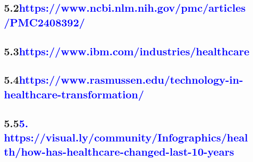 \documentclass[12pt]{article}
\begin{document}
\subsection*{\textbf{5.2\hspace{1cm}\large{\textcolor{blue}{https://www.ncbi.nlm.nih.gov/pmc/articles/PMC2408392/}}}}
\subsection*{\textbf{5.3\hspace{1cm}\large{\textcolor{blue}{https://www.ibm.com/industries/healthcare}}}}
\subsection*{\textbf{5.4\hspace{1cm}\large{\textcolor{blue}{https://www.rasmussen.edu/technology-in-healthcare-transformation/}}}}
\subsection*{\textbf{5.5\hspace{1cm}\large{\textcolor{blue}{5.	https://visual.ly/community/Infographics/health/how-has-healthcare-changed-last-10-years}}}}
\end{document}
